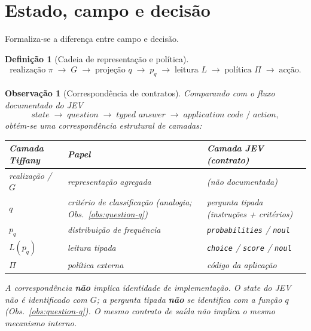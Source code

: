 \documentclass[11pt,a4paper]{article}
\newtheorem{definicao}{Definição}
\newtheorem{observacao}{Observação}
\begin{document}
\section{Estado, campo e decisão}

Formaliza-se a diferença entre campo e decisão.

\begin{definicao}[Cadeia de representação e política]
\label{def:cadeia}
\[
\begin{array}{c}
\text{realização }\pi
\;\longrightarrow\;
G
\;\longrightarrow\;
\text{projeção }q
\;\longrightarrow\;
p_q
\;\longrightarrow\;
\text{leitura }L
\;\longrightarrow\;
\text{política }\Pi
\;\longrightarrow\;
\text{acção.}
\end{array}
\]
\end{definicao}

\begin{observacao}[Correspondência de contratos]
\label{obs:correspondencia}
Comparando com o fluxo documentado do JEV
\[
\textit{state}
\;\longrightarrow\;
\textit{question}
\;\longrightarrow\;
\textit{typed answer}
\;\longrightarrow\;
\textit{application code / action},
\]
obtém-se uma correspondência \emph{estrutural} de camadas:
\begin{center}
\small
\begin{tabular}{@{}lll@{}}
\toprule
Camada Tiffany & Papel & Camada JEV (contrato) \\
\midrule
realização / \(G\) & representação agregada & (não documentada) \\
\(q\) & critério de classificação
  (analogia; Obs.~\ref{obs:question-q}) & pergunta tipada (instruções + critérios) \\
\(p_q\) & distribuição de frequência & \texttt{probabilities} / \texttt{noul} \\
\(L(p_q)\) & leitura tipada & \texttt{choice} / \texttt{score} / \texttt{noul} \\
\(\Pi\) & política externa & código da aplicação \\
\bottomrule
\end{tabular}
\end{center}
A correspondência \textbf{não} implica identidade de implementação. O
\emph{state} do JEV não é identificado com \(G\); a pergunta tipada
\textbf{não} se identifica com a função \(q\) (Obs.~\ref{obs:question-q}).
O mesmo contrato de saída não implica o mesmo mecanismo interno.
\end{observacao}
\end{document}
